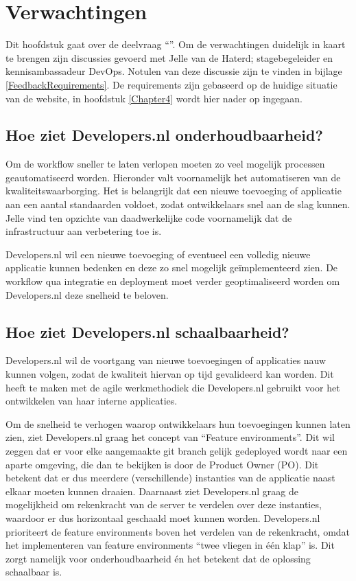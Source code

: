 \chapter{Verwachtingen}

\label{Verwachtingen}

Dit hoofdstuk gaat over de deelvraag \enquote{\deelverwachtingen}. Om de verwachtingen duidelijk in kaart te brengen zijn discussies gevoerd met Jelle van de Haterd; stagebegeleider en kennisambassadeur DevOps. Notulen van deze discussie zijn te vinden in bijlage \ref{FeedbackRequirements}. De requirements zijn gebaseerd op de huidige situatie van de website, in hoofdstuk \ref{Chapter4} wordt hier nader op ingegaan.

\section{Hoe ziet Developers.nl onderhoudbaarheid?}

Om de workflow sneller te laten verlopen moeten zo veel mogelijk processen geautomatiseerd worden. Hieronder valt voornamelijk het automatiseren van de kwaliteitswaarborging. Het is belangrijk dat een nieuwe toevoeging of applicatie aan een aantal standaarden voldoet, zodat ontwikkelaars snel aan de slag kunnen. Jelle vind ten opzichte van daadwerkelijke code voornamelijk dat de infrastructuur aan verbetering toe is.

Developers.nl wil een nieuwe toevoeging of eventueel een volledig nieuwe applicatie kunnen bedenken en deze zo snel mogelijk geïmplementeerd zien. De workflow qua integratie en deployment moet verder geoptimaliseerd worden om Developers.nl deze snelheid te beloven.

\section{Hoe ziet Developers.nl schaalbaarheid?}

Developers.nl wil de voortgang van nieuwe toevoegingen of applicaties nauw kunnen volgen, zodat de kwaliteit hiervan op tijd gevalideerd kan worden. Dit heeft te maken met de agile werkmethodiek die Developers.nl gebruikt voor het ontwikkelen van haar interne applicaties.

Om de snelheid te verhogen waarop ontwikkelaars hun toevoegingen kunnen laten zien, ziet Developers.nl graag het concept van \enquote{Feature environments}. Dit wil zeggen dat er voor elke aangemaakte git branch gelijk gedeployed wordt naar een aparte omgeving, die dan te bekijken is door de Product Owner (PO). Dit betekent dat er dus meerdere (verschillende) instanties van de applicatie naast elkaar moeten kunnen draaien. Daarnaast ziet Developers.nl graag de mogelijkheid om rekenkracht van de server te verdelen over deze instanties, waardoor er dus horizontaal geschaald moet kunnen worden. Developers.nl prioriteert de feature environments boven het verdelen van de rekenkracht, omdat het implementeren van feature environments \enquote{twee vliegen in één klap} is. Dit zorgt namelijk voor onderhoudbaarheid én het betekent dat de oplossing schaalbaar is.

